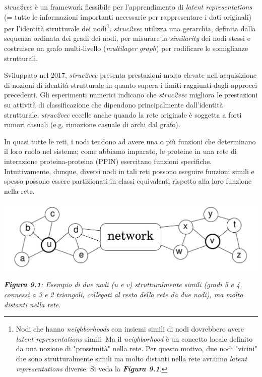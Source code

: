 \documentclass[11pt]{article}
\begin{document}
\textit{struc2vec} è un framework flessibile per l'apprendimento di \textit{latent representations} (= tutte le informazioni importanti necessarie per rappresentare i dati originali) per l'identità strutturale dei nodi\footnote{Nodi che hanno \textit{neighborhoods} con insiemi simili di nodi dovrebbero avere \textit{latent representations} simili. Ma il \textit{neighborhood} è un concetto locale definito da una nozione di "prossimità" nella rete. Per questo motivo, due nodi "vicini" che sono strutturalmente simili ma molto distanti nella rete avranno \textit{latent representations} diverse. Si veda la \textit{\textbf{Figura 9.1}}.}. \textit{struc2vec} utilizza una gerarchia, definita dalla sequenza ordinata dei gradi dei nodi, per misurare la \textit{similarity} dei nodi stessi e costruisce un grafo multi-livello (\textit{multilayer graph}) per codificare le somiglianze strutturali.

Sviluppato nel 2017, \textit{struc2vec} presenta prestazioni molto elevate nell'acquisizione di nozioni di identità strutturale in quanto supera i limiti raggiunti dagli approcci precedenti. Gli esperimenti numerici indicano che \textit{struc2vec} migliora le prestazioni su attività di classificazione che dipendono principalmente dall'identità strutturale; \textit{struc2vec} eccelle anche quando la rete originale è soggetta a forti rumori casuali (e.g. rimozione casuale di archi dal grafo).

In quasi tutte le reti, i nodi tendono ad avere una o più funzioni che determinano il loro ruolo nel sistema; come abbiamo imparato, le proteine in una rete di interazione proteina-proteina (PPIN) esercitano funzioni specifiche. 
Intuitivamente, dunque, diversi nodi in tali reti possono eseguire funzioni simili e spesso possono essere partizionati in classi equivalenti rispetto alla loro funzione nella rete.

\begin{center}
\includegraphics[scale=0.36]{struc1}

\begin{small}\textit{\textbf{Figura 9.1}: Esempio di due nodi (u e v) strutturalmente simili (gradi 5 e 4, connessi a 3 e 2 triangoli, collegati al resto della rete da due nodi), ma molto distanti nella rete}.\end{small}
\end{center}
\end{document}
